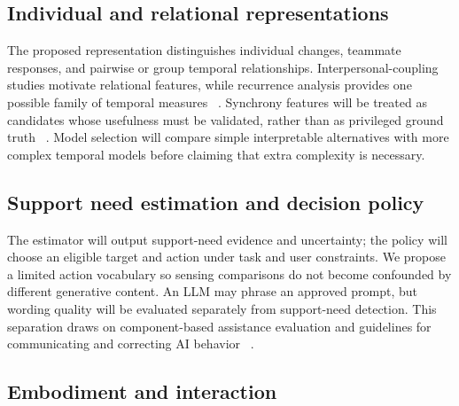 
\subsection{Individual and relational representations}

The proposed representation distinguishes individual changes, teammate responses, and pairwise or group temporal relationships. Interpersonal-coupling studies motivate relational features, while recurrence analysis provides one possible family of temporal measures ~\cite{p8,p52,p65}. Synchrony features will be treated as candidates whose usefulness must be validated, rather than as privileged ground truth ~\cite{p32,p49}. Model selection will compare simple interpretable alternatives with more complex temporal models before claiming that extra complexity is necessary.


\subsection{Support need estimation and decision policy}

The estimator will output support-need evidence and uncertainty; the policy will choose an eligible target and action under task and user constraints. We propose a limited action vocabulary so sensing comparisons do not become confounded by different generative content. An LLM may phrase an approved prompt, but wording quality will be evaluated separately from support-need detection. This separation draws on component-based assistance evaluation and guidelines for communicating and correcting AI behavior ~\cite{pro2,p3}.


\subsection{Embodiment and interaction}

